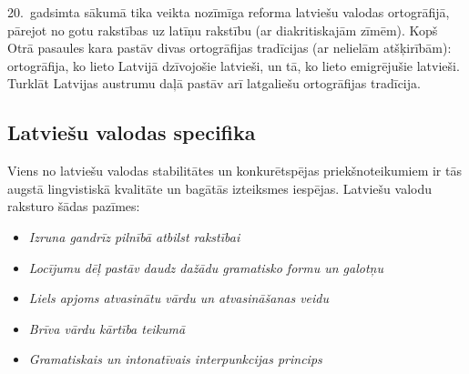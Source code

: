 \begin{multicols}{2}
20.~gadsimta sākumā tika veikta nozīmīga reforma latviešu valodas ortogrāfijā, pārejot no gotu rakstības uz latīņu rakstību (ar diakritiskajām zīmēm).
Kopš Otrā pasaules kara pastāv divas ortogrāfijas tradīcijas (ar \mbox{nelielām} atšķirībām): ortogrāfija, ko lieto Latvijā dzīvojošie latvieši, un tā, ko lieto emigrējušie latvieši.
Turklāt Latvijas austrumu daļā pastāv arī latgaliešu ortogrāfijas tradīcija.

\subsection{Latviešu valodas specifika}


Viens no latviešu valodas stabilitātes un konkurētspējas priekšnoteikumiem ir tās augstā lingvistiskā kvalitāte un bagātās izteiksmes iespējas.
Latviešu valodu raksturo šādas pazīmes:

\begin{itemize}
\item  \textit{Izruna gandrīz pilnībā atbilst rakstībai}
\item \textit{Locījumu dēļ pastāv daudz dažādu gramatisko formu un galotņu}
\item \textit{Liels apjoms atvasinātu vārdu un atvasināšanas veidu}
\item \textit{Brīva vārdu kārtība teikumā}
\item \textit{Gramatiskais un intonatīvais interpunkcijas princips}
\end{itemize}



\end{multicols}
